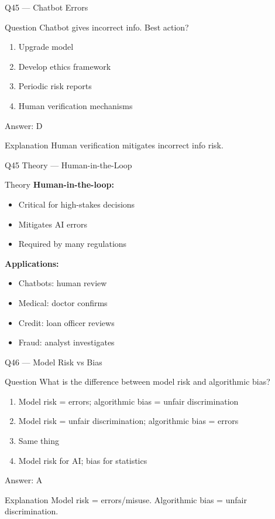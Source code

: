 \documentclass[aspectratio=169,8pt]{beamer}
\begin{document}
	\begin{frame}{Q45 --- Chatbot Errors}
		\begin{block}{Question}
			Chatbot gives incorrect info. Best action?
		\end{block}
		\begin{enumerate}[label=\Alph*.]
			\item Upgrade model
			\item Develop ethics framework
			\item Periodic risk reports
			\item Human verification mechanisms
		\end{enumerate}
		\begin{exampleblock}{Answer: D}
		\end{exampleblock}
		\begin{block}{Explanation}
			Human verification mitigates incorrect info risk.
		\end{block}
	\end{frame}
	
	\begin{frame}{Q45 Theory --- Human-in-the-Loop}
		\begin{block}{Theory}
			\textbf{Human-in-the-loop:}
			\begin{itemize}
				\item Critical for high-stakes decisions
				\item Mitigates AI errors
				\item Required by many regulations
			\end{itemize}
			\textbf{Applications:}
			\begin{itemize}
				\item Chatbots: human review
				\item Medical: doctor confirms
				\item Credit: loan officer reviews
				\item Fraud: analyst investigates
			\end{itemize}
		\end{block}
	\end{frame}
	
	\begin{frame}{Q46 --- Model Risk vs Bias}
		\begin{block}{Question}
			What is the difference between model risk and algorithmic bias?
		\end{block}
		\begin{enumerate}[label=\Alph*.]
			\item Model risk = errors; algorithmic bias = unfair discrimination
			\item Model risk = unfair discrimination; algorithmic bias = errors
			\item Same thing
			\item Model risk for AI; bias for statistics
		\end{enumerate}
		\begin{exampleblock}{Answer: A}
		\end{exampleblock}
		\begin{block}{Explanation}
			Model risk = errors/misuse. Algorithmic bias = unfair discrimination.
		\end{block}
	\end{frame}
	
\end{document}
